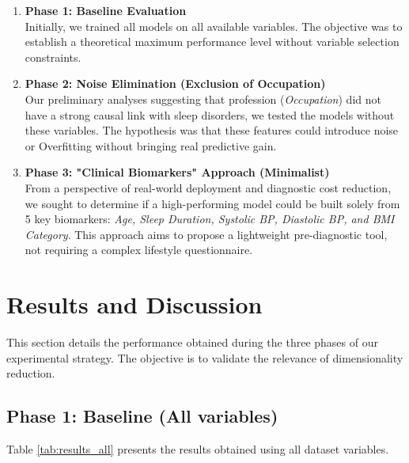 \documentclass[12pt,a4paper]{article}
\begin{document}
    \begin{enumerate}
        \item \textbf{Phase 1: Baseline Evaluation} \\
        Initially, we trained all models on all available variables. The objective was to establish a theoretical maximum performance level without variable selection constraints.

        \item \textbf{Phase 2: Noise Elimination (Exclusion of Occupation)} \\
        Our preliminary analyses suggesting that profession (\textit{Occupation}) did not have a strong causal link with sleep disorders, we tested the models without these variables. The hypothesis was that these features could introduce noise or Overfitting without bringing real predictive gain.

        \item \textbf{Phase 3: "Clinical Biomarkers" Approach (Minimalist)} \\
        From a perspective of real-world deployment and diagnostic cost reduction, we sought to determine if a high-performing model could be built solely from 5 key biomarkers: \textit{Age, Sleep Duration, Systolic BP, Diastolic BP, and BMI Category}. This approach aims to propose a lightweight pre-diagnostic tool, not requiring a complex lifestyle questionnaire.
    \end{enumerate}

    
    \section{Results and Discussion}

    This section details the performance obtained during the three phases of our experimental strategy. The objective is to validate the relevance of dimensionality reduction.

    \subsection{Phase 1: Baseline (All variables)}
    Table \ref{tab:results_all} presents the results obtained using all dataset variables.
\end{document}
